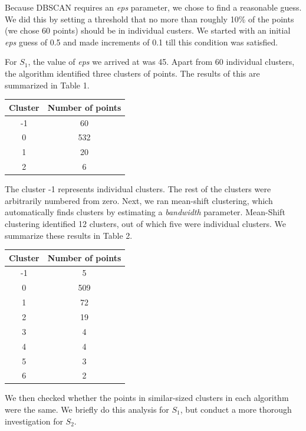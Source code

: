 \documentclass[12pt,a4paper,twocolumn]{article}
\begin{document}
Because DBSCAN requires an \textit{eps} parameter, we chose to find a reasonable guess. We did this by setting a threshold that no more than roughly 10\% of the points (we chose 60 points) should be in individual custers. We started with an initial \textit{eps} guess of 0.5 and made increments of 0.1 till this condition was satisfied.

For $S_1$, the value of \textit{eps} we arrived at was 45. Apart from 60 individual clusters, the algorithm identified three clusters of points. The results of this are summarized in Table 1. \\

\begin{tabular}{|c|c|}
\hline 
\textbf{Cluster} & \textbf{Number of points} \\ 
\hline 
-1 & 60 \\ 
\hline 
0 & 532 \\ 
\hline 
1 & 20 \\ 
\hline 
2 & 6 \\ 
\hline 
\end{tabular}
\begingroup
{}
\endgroup
\hfill\break

The cluster -1 represents individual clusters. The rest of the clusters were arbitrarily numbered from zero. Next, we ran mean-shift clustering, which automatically finds clusters by estimating a \textit{bandwidth} parameter. Mean-Shift clustering identified 12 clusters, out of which five were individual clusters. We summarize these results in Table 2.\\

\begin{tabular}{|c|c|}
\hline 
\textbf{Cluster} & \textbf{Number of points} \\ 
\hline 
-1 & 5 \\ 
\hline 
0 & 509 \\ 
\hline 
1 & 72 \\ 
\hline 
2 & 19 \\ 
\hline 
3 & 4 \\ 
\hline 
4 & 4 \\ 
\hline 
5 & 3 \\ 
\hline 
6 & 2 \\ 
\hline 
\end{tabular}
\begingroup
{}
\endgroup
\hfill\break

We then checked whether the points in similar-sized clusters in each algorithm were the same. We briefly do this analysis for $S_1$, but conduct a more thorough investigation for $S_2$.
\end{document}
